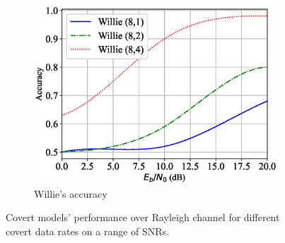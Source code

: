 \begin{figure}[tp!]
\begin{subfigure}{0.28\textwidth}
		\includegraphics[width=\linewidth]{figs/willie_accuracy_rayleigh}
		\caption{Willie's accuracy}
		\label{fig:rayleigh_resutls_willie}
	\end{subfigure}
	\caption{Covert models' performance over Rayleigh channel for different covert data rates on a range of SNRs.}
	\label{fig:rayleigh_resutls}
\end{figure}
